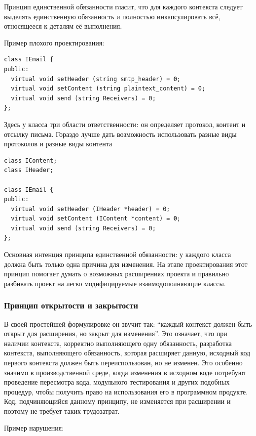 \documentclass[a4paper,12pt,oneside]{article}
\begin{document}
Принцип единственной обязанности гласит, что для каждого контекста следует выделять единственную обязанность и полностью инкапсулировать всё, относящееся к деталям её выполнения.

Пример плохого проектирования:

\begin{lstlisting}
class IEmail {
public:
  virtual void setHeader (string smtp_header) = 0;
  virtual void setContent (string plaintext_content) = 0;
  virtual void send (string Receivers) = 0;
};
\end{lstlisting}

Здесь у класса три области ответственности: он определяет протокол, контент и отсылку письма. Гораздо лучше дать возможность использовать разные виды протоколов и разные виды контента

\begin{lstlisting}
class IContent;
class IHeader;

class IEmail {
public:
  virtual void setHeader (IHeader *header) = 0;
  virtual void setContent (IContent *content) = 0;
  virtual void send (string Receivers) = 0;
};
\end{lstlisting}

Основная интенция принципа единственной обязанности: у каждого класса должна быть только одна причина для изменения. На этапе проектирования этот принцип помогает думать о возможных расширениях проекта и правильно разбивать проект на легко модифицируемые взаимодополняющие классы.

\subsubsection{Принцип открытости и закрытости}\label{OCP}

В своей простейшей формулировке он звучит так: ``каждый контекст должен быть открыт для расширения, но закрыт для изменения''. Это означает, что при наличии контекста, корректно выполняющего одну обязанность, разработка контекста, выполняющего обязанность, которая расширяет данную, исходный код первого контекста должен быть переиспользован, но не изменен. Это особенно значимо в производственной среде, когда изменения в исходном коде потребуют проведение пересмотра кода, модульного тестирования и других подобных процедур, чтобы получить право на использования его в программном продукте. Код, подчиняющийся данному принципу, не изменяется при расширении и поэтому не требует таких трудозатрат.

Пример нарушения:
\end{document}
